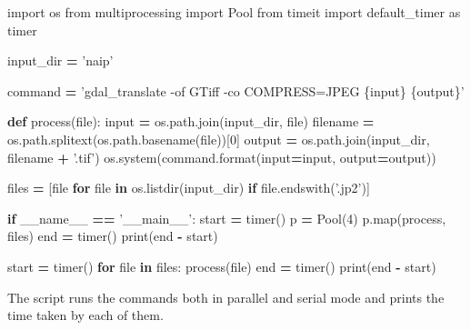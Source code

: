 \documentclass[12pt,a4paper]{article}
\newenvironment{Shaded}{\begin{snugshade}}{\end{snugshade}}
\newcommand{\BuiltInTok}[1]{#1}
\newcommand{\ControlFlowTok}[1]{\textcolor[rgb]{0.13,0.29,0.53}{\textbf{#1}}}
\newcommand{\DecValTok}[1]{\textcolor[rgb]{0.00,0.00,0.81}{#1}}
\newcommand{\ImportTok}[1]{#1}
\newcommand{\KeywordTok}[1]{\textcolor[rgb]{0.13,0.29,0.53}{\textbf{#1}}}
\newcommand{\NormalTok}[1]{#1}
\newcommand{\OperatorTok}[1]{\textcolor[rgb]{0.81,0.36,0.00}{\textbf{#1}}}
\newcommand{\SpecialCharTok}[1]{\textcolor[rgb]{0.00,0.00,0.00}{#1}}
\newcommand{\StringTok}[1]{\textcolor[rgb]{0.31,0.60,0.02}{#1}}
\newcommand{\VariableTok}[1]{\textcolor[rgb]{0.00,0.00,0.00}{#1}}
\begin{document}
\begin{Shaded}
\begin{Highlighting}[]
\ImportTok{import}\NormalTok{ os}
\ImportTok{from}\NormalTok{ multiprocessing }\ImportTok{import}\NormalTok{ Pool}
\ImportTok{from}\NormalTok{ timeit }\ImportTok{import}\NormalTok{ default_timer }\ImportTok{as}\NormalTok{ timer}

\NormalTok{input_dir }\OperatorTok{=} \StringTok{'naip'}

\NormalTok{command }\OperatorTok{=} \StringTok{'gdal_translate -of GTiff -co COMPRESS=JPEG }\SpecialCharTok{\{input\}}\StringTok{ }\SpecialCharTok{\{output\}}\StringTok{'}

\KeywordTok{def}\NormalTok{ process(}\BuiltInTok{file}\NormalTok{):}
    \BuiltInTok{input} \OperatorTok{=}\NormalTok{ os.path.join(input_dir, }\BuiltInTok{file}\NormalTok{)}
\NormalTok{    filename }\OperatorTok{=}\NormalTok{ os.path.splitext(os.path.basename(}\BuiltInTok{file}\NormalTok{))[}\DecValTok{0}\NormalTok{]}
\NormalTok{    output }\OperatorTok{=}\NormalTok{  os.path.join(input_dir, filename }\OperatorTok{+} \StringTok{'.tif'}\NormalTok{)}
\NormalTok{    os.system(command.}\BuiltInTok{format}\NormalTok{(}\BuiltInTok{input}\OperatorTok{=}\BuiltInTok{input}\NormalTok{, output}\OperatorTok{=}\NormalTok{output))}
    
\NormalTok{files }\OperatorTok{=}\NormalTok{ [}\BuiltInTok{file} \ControlFlowTok{for} \BuiltInTok{file} \KeywordTok{in}\NormalTok{ os.listdir(input_dir) }\ControlFlowTok{if} \BuiltInTok{file}\NormalTok{.endswith(}\StringTok{'.jp2'}\NormalTok{)]}

\ControlFlowTok{if} \VariableTok{__name__} \OperatorTok{==} \StringTok{'__main__'}\NormalTok{:}
\NormalTok{  start }\OperatorTok{=}\NormalTok{ timer()}
\NormalTok{  p }\OperatorTok{=}\NormalTok{ Pool(}\DecValTok{4}\NormalTok{)}
\NormalTok{  p.}\BuiltInTok{map}\NormalTok{(process, files)}
\NormalTok{  end }\OperatorTok{=}\NormalTok{ timer()}
  \BuiltInTok{print}\NormalTok{(end }\OperatorTok{-}\NormalTok{ start)}
  
\NormalTok{  start }\OperatorTok{=}\NormalTok{ timer()}
  \ControlFlowTok{for} \BuiltInTok{file} \KeywordTok{in}\NormalTok{ files:}
\NormalTok{    process(}\BuiltInTok{file}\NormalTok{)}
\NormalTok{  end }\OperatorTok{=}\NormalTok{ timer()}
  \BuiltInTok{print}\NormalTok{(end }\OperatorTok{-}\NormalTok{ start)}
\end{Highlighting}
\end{Shaded}

The script runs the commands both in parallel and serial mode and prints
the time taken by each of them.
\end{document}
